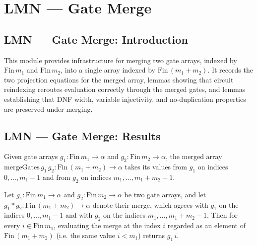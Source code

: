 \section{LMN --- Gate Merge}
\subsection*{LMN --- Gate Merge: Introduction}

This module provides infrastructure for merging two gate arrays, indexed by
$\mathrm{Fin}\,m_1$ and $\mathrm{Fin}\,m_2$, into a single array indexed by
$\mathrm{Fin}\,(m_1 + m_2)$. It records the two projection equations for the merged
array, lemmas showing that circuit reindexing reroutes evaluation correctly through the
merged gates, and lemmas establishing that DNF width, variable injectivity, and
no-duplication properties are preserved under merging.

\subsection*{LMN --- Gate Merge: Results}

\begin{definition}
\label{LMN.mergeGates}
\leanok
Given gate arrays $g_1 : \mathrm{Fin}\,m_1 \to \alpha$ and
$g_2 : \mathrm{Fin}\,m_2 \to \alpha$, the merged array
$\mathrm{mergeGates}\,g_1\,g_2 : \mathrm{Fin}\,(m_1+m_2) \to \alpha$ takes its values
from $g_1$ on indices $0,\dots,m_1-1$ and from $g_2$ on indices
$m_1,\dots,m_1+m_2-1$.
\end{definition}

\begin{lemma}
\label{LMN.mergeGates_castAdd}
\leanok
{}
Let $g_1 : \mathrm{Fin}\,m_1 \to \alpha$ and $g_2 : \mathrm{Fin}\,m_2 \to \alpha$ be two
gate arrays, and let $g_1 \ast g_2 : \mathrm{Fin}\,(m_1+m_2) \to \alpha$ denote their
merge, which agrees with $g_1$ on the indices $0,\dots,m_1-1$ and with $g_2$ on the
indices $m_1,\dots,m_1+m_2-1$. Then for every $i \in \mathrm{Fin}\,m_1$, evaluating the
merge at the index $i$ regarded as an element of $\mathrm{Fin}\,(m_1+m_2)$ (i.e. the
same value $i < m_1$) returns $g_1\,i$.
\end{lemma}

